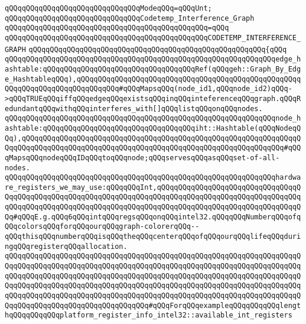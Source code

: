 \newline
\verb|qQQqqQQqqQQqqQQqqQQqqQQqqQQqqQQqModeqQQq=qQQqUnt;|\newline
\newline
\verb|qQQqqQQqqQQqqQQqqQQqqQQqqQQqqQQqCodetemp_Interference_Graph|\newline
\verb|qQQqqQQqqQQqqQQqqQQqqQQqqQQqqQQqqQQqqQQqqQQqqQQq=qQQq|\newline
\verb|qQQqqQQqqQQqqQQqqQQqqQQqqQQqqQQqqQQqqQQqqQQqqQQqCODETEMP_INTERFERENCE_GRAPH|\newline
\verb|qQQqqQQqqQQqqQQqqQQqqQQqqQQqqQQqqQQqqQQqqQQqqQQqqQQqqQQq{qQQq|\newline
\verb|qQQqqQQqqQQqqQQqqQQqqQQqqQQqqQQqqQQqqQQqqQQqqQQqqQQqqQQqqQQqqQQqedge_hashtable:qQQqqQQqqQQqqQQqqQQqqQQqqQQqqQQqqQQqRef(qQQqgeh::Graph_By_Edge_HashtableqQQq),qQQqqQQqqQQqqQQqqQQqqQQqqQQqqQQqqQQqqQQqqQQqqQQqqQQqqQQqqQQqqQQqqQQqqQQqqQQqqQQq#qQQqMapsqQQq(node_id1,qQQqnode_id2)qQQq->qQQqTRUEqQQqiffqQQqedgeqQQqexistsqQQqinqQQqinteferenceqQQqgraph.qQQqRedundantqQQqwithqQQqinterferes_with[]qQQqlistqQQqonqQQqnodes.|\newline
\verb|qQQqqQQqqQQqqQQqqQQqqQQqqQQqqQQqqQQqqQQqqQQqqQQqqQQqqQQqqQQqqQQqnode_hashtable:qQQqqQQqqQQqqQQqqQQqqQQqqQQqqQQqqQQqiht::Hashtable(qQQqNodeqQQq),qQQqqQQqqQQqqQQqqQQqqQQqqQQqqQQqqQQqqQQqqQQqqQQqqQQqqQQqqQQqqQQqqQQqqQQqqQQqqQQqqQQqqQQqqQQqqQQqqQQqqQQqqQQqqQQqqQQqqQQqqQQqqQQqqQQq#qQQqMapsqQQqnodeqQQqIDqQQqtoqQQqnode;qQQqservesqQQqasqQQqset-of-all-nodes.|\newline
\newline
\verb|qQQqqQQqqQQqqQQqqQQqqQQqqQQqqQQqqQQqqQQqqQQqqQQqqQQqqQQqqQQqqQQqhardware_registers_we_may_use:qQQqqQQqInt,qQQqqQQqqQQqqQQqqQQqqQQqqQQqqQQqqQQqqQQqqQQqqQQqqQQqqQQqqQQqqQQqqQQqqQQqqQQqqQQqqQQqqQQqqQQqqQQqqQQqqQQqqQQqqQQqqQQqqQQqqQQqqQQqqQQqqQQqqQQqqQQqqQQqqQQqqQQqqQQqqQQqqQQqqQQqqQQq#qQQqE.g.qQQq6qQQqintqQQqregsqQQqonqQQqintel32.qQQqqQQqNumberqQQqofqQQqcolorsqQQqforqQQqourqQQqgraph-colorerqQQq--qQQqthisqQQqnumberqQQqisqQQqtheqQQqcenterqQQqofqQQqourqQQqlifeqQQqduringqQQqregisterqQQqallocation.|\newline
\verb|qQQqqQQqqQQqqQQqqQQqqQQqqQQqqQQqqQQqqQQqqQQqqQQqqQQqqQQqqQQqqQQqqQQqqQQqqQQqqQQqqQQqqQQqqQQqqQQqqQQqqQQqqQQqqQQqqQQqqQQqqQQqqQQqqQQqqQQqqQQqqQQqqQQqqQQqqQQqqQQqqQQqqQQqqQQqqQQqqQQqqQQqqQQqqQQqqQQqqQQqqQQqqQQqqQQqqQQqqQQqqQQqqQQqqQQqqQQqqQQqqQQqqQQqqQQqqQQqqQQqqQQqqQQqqQQqqQQqqQQqqQQqqQQqqQQqqQQqqQQqqQQqqQQqqQQqqQQqqQQqqQQqqQQqqQQqqQQqqQQqqQQqqQQqqQQqqQQqqQQqqQQqqQQqqQQqqQQqqQQqqQQq#qQQqForqQQqexampleqQQqqQQqqQQqlengthqQQqqQQqqQQqplatform_register_info_intel32::available_int_registers|\newline
